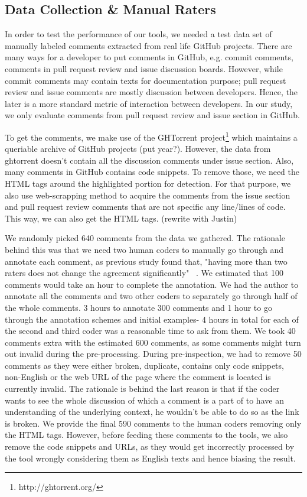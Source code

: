 \subsection{Data Collection \& Manual Raters}\label{data}

In order to test the performance of our tools, we needed a test data set of manually labeled comments extracted from real life GitHub projects. There are many ways for a developer to put comments in GitHub, e.g. commit comments, comments in pull request review and issue discussion boards. However, while commit comments may contain texts for documentation purpose; pull request review and issue comments are mostly discussion between developers. Hence, the later is a more standard metric of interaction between developers. In our study, we only evaluate comments from pull request review and issue section in GitHub.

To get the comments, we make use of the GHTorrent project\footnote{http://ghtorrent.org/} which maintains a queriable archive of GitHub projects (put year?). However, the data from ghtorrent doesn't contain all the discussion comments under issue section. Also, many comments in GitHub contains code snippets. To remove those, we need the HTML tags around the highlighted portion for detection. For that purpose, we also use web-scrapping method to acquire the comments from the issue section and pull request review comments that are not specific any line/lines of code. This way, we can also get the HTML tags. (rewrite with Justin)

We randomly picked 640 comments from the data we gathered. The rationale behind this was that we need two human coders to manually go through and annotate each comment, as previous study found that, "having more than two raters does not change the agreement significantly" ~\cite{murgia2014developers}. We estimated that 100 comments would take an hour to complete the annotation. We had the author to annotate all the comments and two other coders to separately go through half of the whole comments. 3 hours to annotate 300 comments and 1 hour to go through the annotation schemes and initial examples- 4 hours in total for each of the second and third coder was a reasonable time to ask from them. We took 40 comments extra with the estimated 600 comments, as some comments might turn out invalid during the pre-processing. 
During pre-inspection, we had to remove 50 comments as they were either broken, duplicate, contains only code snippets, non-English or the web URL of the page where the comment is located is currently invalid. The rationale is behind the last reason is that if the coder wants to see the whole discussion of which a comment is a part of to have an understanding of the underlying context, he wouldn't be able to do so as the link is broken. We provide the final 590 comments to the human coders removing only the HTML tags. However, before feeding these comments to the tools, we also remove the code snippets and URLs, as they would get incorrectly processed by the tool wrongly considering them as English texts and hence biasing the result. 

